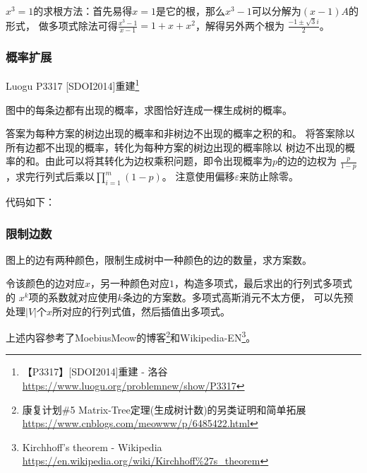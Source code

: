 $x^3=1$的求根方法：首先易得$x=1$是它的根，那么$x^3-1$可以分解为$(x-1)A$的形式，
做多项式除法可得$\frac{x^3-1}{x-1}=1+x+x^2$，解得另外两个根为
$\frac{-1\pm\sqrt{3}i}{2}$。

\subsubsection{概率扩展}
Luogu P3317 [SDOI2014]重建\footnote{【P3317】[SDOI2014]重建 - 洛谷
\url{https://www.luogu.org/problemnew/show/P3317}
}

图中的每条边都有出现的概率，求图恰好连成一棵生成树的概率。

答案为每种方案的树边出现的概率和非树边不出现的概率之积的和。
将答案除以所有边都不出现的概率，转化为每种方案的树边出现的概率除以
树边不出现的概率的和。由此可以将其转化为边权乘积问题，即令出现概率为$p$的边的边权为
$\frac{p}{1-p}$，求完行列式后乘以$\displaystyle \prod_{i=1}^m{(1-p)}$。
注意使用偏移$\varepsilon$来防止除零。

代码如下：


\subsubsection{限制边数}
图上的边有两种颜色，限制生成树中一种颜色的边的数量，求方案数。

令该颜色的边对应$x$，另一种颜色对应$1$，构造多项式，最后求出的行列式多项式的
$x^k$项的系数就对应使用$k$条边的方案数。多项式高斯消元不太方便，
可以先预处理$|V|$个$x$所对应的行列式值，然后插值出多项式。

上述内容参考了MoebiusMeow的博客\footnote{
	康复计划\#5 Matrix-Tree定理(生成树计数)的另类证明和简单拓展
	\url{https://www.cnblogs.com/meowww/p/6485422.html}
}和Wikipedia-EN\footnote{
	Kirchhoff's theorem - Wikipedia\\
	\url{https://en.wikipedia.org/wiki/Kirchhoff\%27s\_theorem}
}。
